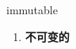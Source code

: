 
\begin{frame}
{\huge immutable}
\begin{center}
\begin{enumerate}\Large
  \item \textbf{不可变的}
\end{enumerate}
\end{center}
\end{frame}
